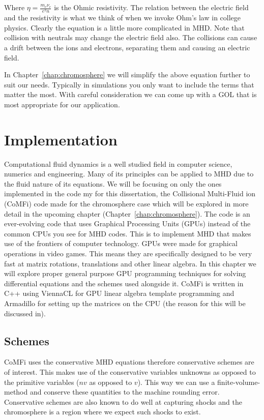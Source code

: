 \documentclass[12pt,upcase]{umlthesis}
\begin{document}
Where $\eta = \frac{m_e \nu_e}{e^2 n}$ is the Ohmic resistivity. The relation between the electric field and the resistivity is what we think of when we invoke Ohm's law in college physics. Clearly the equation is a little more complicated in MHD\@. Note that collision with neutrals may change the electric field also. The collisions can cause a drift between the ions and electrons, separating them and causing an electric field.

In Chapter~\ref{chap:chromosphere} we will simplify the above equation further to suit our needs. Typically in simulations you only want to include the terms that matter the most. With careful consideration we can come up with a GOL that is most appropriate for our application.

\chapter{Implementation}\label{chap:implementation}

Computational fluid dynamics is a well studied field in computer science, numerics and engineering. Many of its principles can be applied to MHD due to the fluid nature of its equations. We will be focusing on only the ones implemented in the code my for this dissertation, the Collisional Multi-Fluid ion (CoMFi) code made for the chromosphere case which will be explored in more detail in the upcoming chapter (Chapter~\ref{chap:chromosphere}). The code is an ever-evolving code that uses Graphical Processing Units (GPUs) instead of the common CPUs you see for MHD codes. This is to implement MHD that makes use of the frontiers of computer technology. GPUs were made for graphical operations in video games. This means they are specifically designed to be very fast at matrix rotations, translations and other linear algebra. In this chapter we will explore proper general purpose GPU programming techniques for solving differential equations and the schemes used alongside it. CoMFi is written in C++ using ViennaCL for GPU linear algebra template programming and Armadillo for setting up the matrices on the CPU (the reason for this will be discussed in).

\section{Schemes}\label{sec:schemes}

CoMFi uses the conservative MHD equations therefore conservative schemes are of interest. This makes use of the conservative variables unknowns as opposed to the primitive variables ($n v$ as opposed to $v$). This way we can use a finite-volume-method and conserve these quantities to the machine rounding error. Conservative schemes are also known to do well at capturing shocks and the chromosphere is a region where we expect such shocks to exist.
\end{document}
